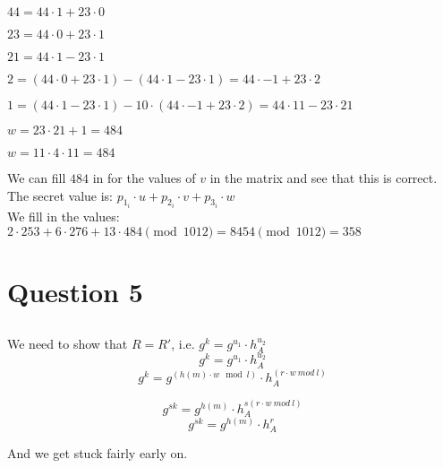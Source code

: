 \documentclass{article}
\begin{document}
$44 = 44 \cdot 1 + 23 \cdot 0$

$23 = 44 \cdot 0 + 23 \cdot 1$

$21 = 44 \cdot 1 - 23 \cdot 1$

$2 = (44 \cdot 0 + 23 \cdot 1) - (44 \cdot 1 - 23 \cdot 1) = 44 \cdot -1 + 23 \cdot 2 $

$1 = (44 \cdot 1 - 23 \cdot 1) - 10 \cdot (44 \cdot -1 + 23 \cdot 2) = 44 \cdot 11 - 23 \cdot 21$

$w = 23 \cdot 21 + 1 = 484$

$w = 11 \cdot 4 \cdot 11 = 484$

We can fill $484$ in for the values of $v$ in the matrix and see that this is correct.\\

The secret value is: $p_{{1}_{i}} \cdot u + p_{{2}_{i}} \cdot v + p_{{3}_{i}} \cdot w$\\
We fill in the values: $ 2 \cdot 253 + 6 \cdot 276 + 13 \cdot 484 \pmod{1012} = 8454 \pmod{1012} = 358$

\section{Question 5}
\subsection{}
We need to show that $R = R'$, i.e. $g^k=g^{u_1} \cdot h_A^{u_2}$
\[ g^k=g^{u_1} \cdot h_A^{u_2} \]
\[ g^k=g^{(h(m) \cdot w \mod l)} \cdot h_A^{(r \cdot w~mod~l)} \]

\[ g^{sk}=g^{h(m)} \cdot h_A^{s(r \cdot w~mod~l)} \]
\[ g^{sk}=g^{h(m)} \cdot h_A^{r} \]

And we get stuck fairly early on.



\end{document}
